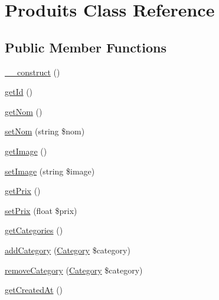 \hypertarget{class_app_1_1_entity_1_1_produits}{}\section{Produits Class Reference}
\label{class_app_1_1_entity_1_1_produits}
\subsection*{Public Member Functions}
\begin{DoxyCompactItemize}
\item 
\mbox{\hyperlink{class_app_1_1_entity_1_1_produits_a095c5d389db211932136b53f25f39685}{\+\_\+\+\_\+construct}} ()
\item 
\mbox{\hyperlink{class_app_1_1_entity_1_1_produits_a12251d0c022e9e21c137a105ff683f13}{get\+Id}} ()
\item 
\mbox{\hyperlink{class_app_1_1_entity_1_1_produits_a184f2299ee4553fa0782ea87c9aed362}{get\+Nom}} ()
\item 
\mbox{\hyperlink{class_app_1_1_entity_1_1_produits_ad9079562ce21dfd57a8fb9cfe1e8f8ba}{set\+Nom}} (string \$nom)
\item 
\mbox{\hyperlink{class_app_1_1_entity_1_1_produits_a2af8add37797384585cae101fb8cbfe7}{get\+Image}} ()
\item 
\mbox{\hyperlink{class_app_1_1_entity_1_1_produits_acb73da7147aa4dbe762b5e438974bea9}{set\+Image}} (string \$image)
\item 
\mbox{\hyperlink{class_app_1_1_entity_1_1_produits_a36d5e4316fca03a6f45dc4554d86cb12}{get\+Prix}} ()
\item 
\mbox{\hyperlink{class_app_1_1_entity_1_1_produits_a85091a25a9a780dfb7dca7cbf27b3a92}{set\+Prix}} (float \$prix)
\item 
\mbox{\hyperlink{class_app_1_1_entity_1_1_produits_a8729ba486702e7e12a3fff08965e1e7f}{get\+Categories}} ()
\item 
\mbox{\hyperlink{class_app_1_1_entity_1_1_produits_aca93a29c7e12ee27f70c76e0a828c856}{add\+Category}} (\mbox{\hyperlink{class_app_1_1_entity_1_1_category}{Category}} \$category)
\item 
\mbox{\hyperlink{class_app_1_1_entity_1_1_produits_aa0568b366ced44f87b82aa00fe6ff1b7}{remove\+Category}} (\mbox{\hyperlink{class_app_1_1_entity_1_1_category}{Category}} \$category)
\item 
\mbox{\hyperlink{class_app_1_1_entity_1_1_produits_a0f0455d4aafe27d1b0720c3bcfff2847}{get\+Created\+At}} ()
\item 

\end{DoxyCompactItemize}
